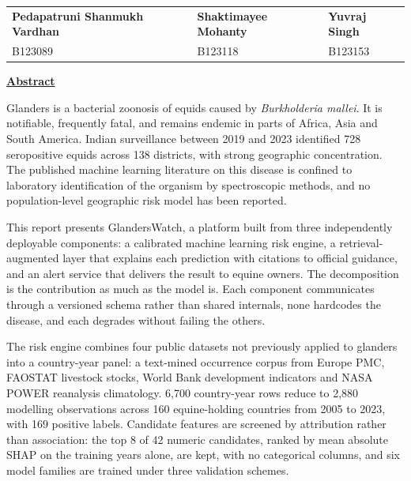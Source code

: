 \documentclass[10pt,openany]{report}
\begin{document}
\vspace{2.5cm}
\noindent
\noindent
\begin{tabular}{@{}p{5.75cm}p{4.35cm}p{4.35cm}@{}}
\textbf{Pedapatruni Shanmukh Vardhan} & \textbf{Shaktimayee Mohanty} & \textbf{Yuvraj Singh} \\[0.12em]
B123089 & B123118 & B123153 \\
\end{tabular}

\newpage
\pagestyle{plain}
\noindent\underline{\textbf{Abstract}}

\vspace{0.7cm}
\noindent
Glanders is a bacterial zoonosis of equids caused by \textit{Burkholderia mallei}. It is
notifiable, frequently fatal, and remains endemic in parts of Africa, Asia and South America.
Indian surveillance between 2019 and 2023 identified 728 seropositive equids across 138 districts,
with strong geographic concentration. The published machine learning literature on this disease is
confined to laboratory identification of the organism by spectroscopic methods, and no
population-level geographic risk model has been reported.

\vspace{0.5em}
\noindent
This report presents GlandersWatch, a platform built from three independently deployable components:
a calibrated machine learning risk engine, a retrieval-augmented layer that explains each
prediction with citations to official guidance, and an alert service that delivers the result to
equine owners. The decomposition is the contribution as much as the model is. Each component
communicates through a versioned schema rather than shared internals, none hardcodes the disease,
and each degrades without failing the others.

\vspace{0.5em}
\noindent
The risk engine combines four public datasets not previously applied to glanders into a country-year
panel: a text-mined occurrence corpus from Europe PMC, FAOSTAT livestock stocks, World Bank
development indicators and NASA POWER reanalysis climatology. 6,700 country-year rows reduce to
2,880 modelling observations across 160 equine-holding countries from 2005 to 2023, with
169 positive labels. Candidate features are screened by attribution rather than association:
the top 8 of 42 numeric candidates, ranked by mean absolute SHAP on the training years
alone, are kept, with no categorical columns, and six model families are trained under three
validation schemes.
\end{document}
